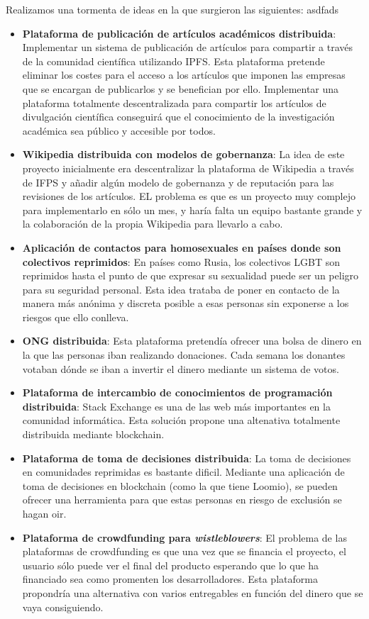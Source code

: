 Realizamos una tormenta de ideas en la que surgieron las siguientes:
asdfads
\begin{itemize}
  \item \textbf{Plataforma de publicación de artículos académicos distribuida}: Implementar un sistema de publicación de artículos para compartir a través de la comunidad científica utilizando IPFS. Esta plataforma pretende eliminar los costes para el acceso a los artículos que imponen las empresas que se encargan de publicarlos y se benefician por ello. Implementar una plataforma totalmente descentralizada para compartir los artículos de divulgación científica conseguirá que el conocimiento de la investigación académica sea público y accesible por todos.

  \item \textbf{Wikipedia distribuida con modelos de gobernanza}: La idea de este proyecto inicialmente era descentralizar la plataforma de Wikipedia a través de IFPS y añadir algún modelo de gobernanza y de reputación para las revisiones de los artículos. EL problema es que es un proyecto muy complejo para implementarlo en sólo un mes, y haría falta un equipo bastante grande y la colaboración de la propia Wikipedia para llevarlo a cabo.

  \item \textbf{Aplicación de contactos para homosexuales en países donde son colectivos reprimidos}: En países como Rusia, los colectivos LGBT son reprimidos hasta el punto de que expresar su sexualidad puede ser un peligro para su seguridad personal. Esta idea trataba de poner en contacto de la manera más anónima y discreta posible a esas personas sin exponerse a los riesgos que ello conlleva.

  \item \textbf{ONG distribuida}: Esta plataforma pretendía ofrecer una bolsa de dinero en la que las personas iban realizando donaciones. Cada semana los donantes votaban dónde se iban a invertir el dinero mediante un sistema de votos.

  \item \textbf{Plataforma de intercambio de conocimientos de programación distribuida}: Stack Exchange es una de las web más importantes en la comunidad informática. Esta solución propone una altenativa totalmente distribuida mediante blockchain.

  \item \textbf{Plataforma de toma de decisiones distribuida}: La toma de decisiones en comunidades reprimidas es bastante dificil. Mediante una aplicación de toma de decisiones en blockchain (como la que tiene Loomio), se pueden ofrecer una herramienta para que estas personas en riesgo de exclusión se hagan oir.

  \item \textbf{Plataforma de crowdfunding para \textit{wistleblowers}}: El problema de las plataformas de crowdfunding es que una vez que se financia el proyecto, el usuario sólo puede ver el final del producto esperando que lo que ha financiado sea como promenten los desarrolladores. Esta plataforma propondría una alternativa con varios entregables en función del dinero que se vaya consiguiendo.


\end{itemize}


